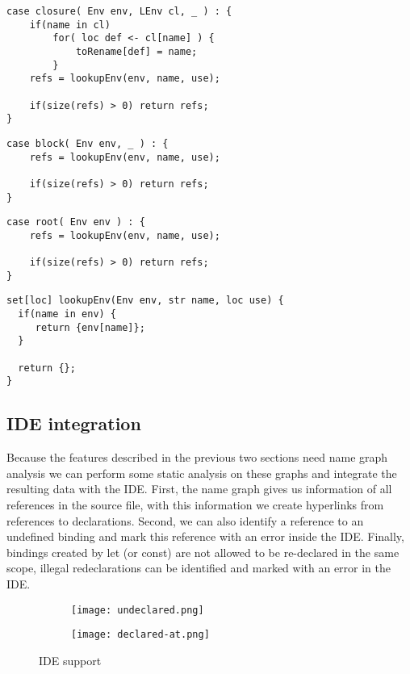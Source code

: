 \begin{lstlisting}[language=rascal]
case closure( Env env, LEnv cl, _ ) : {
	if(name in cl) 
		for( loc def <- cl[name] ) {
			toRename[def] = name;
		}
	refs = lookupEnv(env, name, use);
			
	if(size(refs) > 0) return refs;
}
\end{lstlisting}


\begin{lstlisting}[language=rascal]
case block( Env env, _ ) : {
	refs = lookupEnv(env, name, use);
			
	if(size(refs) > 0) return refs;
}
\end{lstlisting}

\begin{lstlisting}[language=rascal]
case root( Env env ) : {
	refs = lookupEnv(env, name, use);
			
	if(size(refs) > 0) return refs;
}
\end{lstlisting}

\begin{lstlisting}[language=rascal]
set[loc] lookupEnv(Env env, str name, loc use) {
  if(name in env) {
	 return {env[name]};
  }
    
  return {};
}
\end{lstlisting}

\subsection{IDE integration}
Because the features described in the previous two sections need name graph analysis we can perform some static analysis on these graphs and integrate the resulting data with the IDE. First, the name graph gives us information of all references in the source file, with this information we create hyperlinks from references to declarations. Second, we can also identify a reference to an undefined binding and mark this reference with an error inside the IDE. Finally, bindings created by let (or const) are not allowed to be re-declared in the same scope, illegal redeclarations can be identified and marked with an error in the IDE.

\begin{figure}
\centering

\begin{subfigure}{.49\textwidth}
	\centering
	\texttt{[image: undeclared.png]}
\end{subfigure}\hfill%
\begin{subfigure}{.49\textwidth}
	\centering	
	\texttt{[image: declared-at.png]}
\end{subfigure}

\caption{IDE support}
\end{figure}